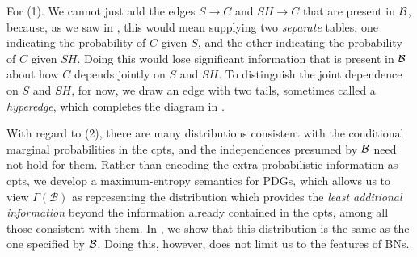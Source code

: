 \documentclass{article}
\newcommand{\MN}{PDG}
\numberwithin{equation}{section}
\begin{document}
\begin{example}[emulating a BN]
For (1). We cannot just add the edges
                $S \to C$ and $SH \to C$ that are present in $\cal B$,
                because, as we saw in , this
                would mean supplying two \emph{separate} tables, one
                indicating the probability of $C$ given $S$, and the
                other indicating the probability of $C$ given
                $\mathit{SH}$.
Doing this would lose significant information that is present in $\cal
B$  about how $C$ depends jointly on $S$ and $SH$.
		To distinguish the joint dependence on $S$ and
                $\mathit{SH}$, for now, we draw an edge with two
                tails, sometimes called a \emph{hyperedge}, which
                completes the diagram in . 

        With regard to (2), there are many
                distributions consistent with the conditional marginal
        probabilities in the cpts, and the independences presumed by
        $\cal B$ need not hold for them. Rather than encoding the
        extra probabilistic information as cpts, we develop a
        maximum-entropy semantics for PDGs, which allows us to
view  $\Gamma(\mathcal B)$ as representing the
        distribution which provides the \emph{least additional
          information} beyond the information already contained in the
        cpts, among all those consistent with them. In
        , we show that this distribution
        is the same as the one specified by $\cal B$. 
	Doing this, however, does not limit us to the features of BNs. 
	

\end{example}
\end{document}
